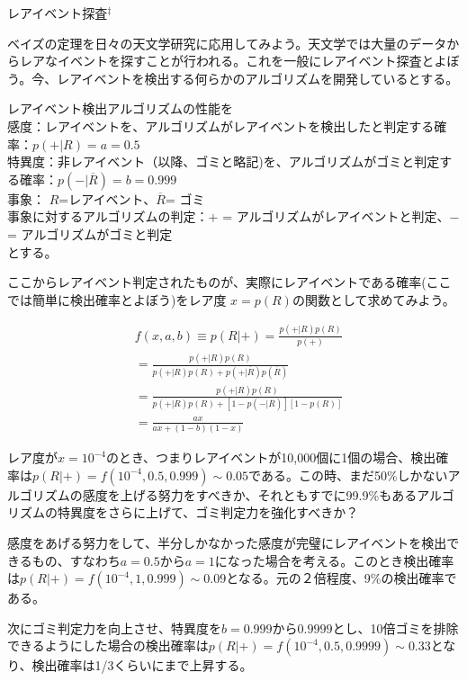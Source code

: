 \begin{itembox}{レアイベント探査$^\ddagger$}
\footnotesize

ベイズの定理を日々の天文学研究に応用してみよう。天文学では大量のデータからレアなイベントを探すことが行われる。これを一般にレアイベント探査とよぼう。今、レアイベントを検出する何らかのアルゴリズムを開発しているとする。

レアイベント検出アルゴリズムの性能を\\
感度：レアイベントを、アルゴリズムがレアイベントを検出したと判定する確率：$p(+|R) = a = 0.5$ \\
特異度：非レアイベント（以降、ゴミと略記)を、アルゴリズムがゴミと判定する確率：$p(-|\overline{R}) = b = 0.999$ \\
事象： $R$=レアイベント、$\overline{R}$= ゴミ\\
事象に対するアルゴリズムの判定：$+$ = アルゴリズムがレアイベントと判定、$-$ = アルゴリズムがゴミと判定\\
とする。

ここからレアイベント判定されたものが、実際にレアイベントである確率(ここでは簡単に検出確率とよぼう)をレア度 $x=p(R)$の関数として求めてみよう。

\begin{align}
    &f(x,a,b) \equiv p(R|+) = \frac{p(+|R) p(R)}{ p(+)} \nonumber \\ 
    &= \frac{p(+|R) p(R)}{ p(+|R) p(R) + p(+|\overline{R}) p(\overline{R})} \nonumber \\
    &= \frac{p(+|R) p(R)}{ p(+|R) p(R) + [ 1- p(-|\overline{R}) ] [1- p(R)]} \nonumber \\
    &= \frac{a x }{a x + ( 1 - b ) (1 - x)} 
\end{align}

レア度が$x = 10^{-4}$のとき、つまりレアイベントが10,000個に1個の場合、検出確率は$p(R|+) = f(10^{-4}, 0.5, 0.999) \sim 0.05$である。この時、まだ50\%しかないアルゴリズムの感度を上げる努力をすべきか、それともすでに99.9\%もあるアルゴリズムの特異度をさらに上げて、ゴミ判定力を強化すべきか？

感度をあげる努力をして、半分しかなかった感度が完璧にレアイベントを検出できるもの、すなわち$a=0.5$から$a=1$になった場合を考える。このとき検出確率は$p(R|+) = f(10^{-4}, 1, 0.999) \sim 0.09$となる。元の２倍程度、9\%の検出確率である。

次にゴミ判定力を向上させ、特異度を$b=0.999$から$0.9999$とし、10倍ゴミを排除できるようにした場合の検出確率は$p(R|+) = f(10^{-4}, 0.5, 0.9999) \sim 0.33$となり、検出確率は1/3くらいにまで上昇する。


\end{itembox}
